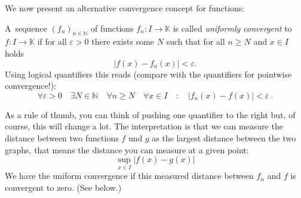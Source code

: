 

We now present an alternative convergence concept for functions:

\begin{Definition}
A~sequence $(f_n)_{n\in\mathbb{N}}$ of functions $f_n:I\to\mathbb{K}$ is called \emph{uniformly convergent} to $f:I\to\mathbb{K}$ if for all $\varepsilon>0$ there exists some $N$ such that for all $n\geq N$ and $x\in I$ holds
\[|f(x)-f_n(x)|<\varepsilon.\]
Using logical quantifiers this reads (compare with the quantifiers for pointwise convergence!):
\begin{equation}\label{def:lunifconv}
		 \forall \varepsilon > 0 
	\quad \exists N \in \mathbb{N}
	\quad \forall n \geq N
	\quad \forall x \in I
	\quad : \quad
	|f_n(x)-f(x)|<\varepsilon \ .
\end{equation}
\end{Definition}

As a rule of thumb, you can think of pushing one quantifier to the right but, of course, this will change a lot.
The interpretation is that we can measure the distance between two functions 
$f$ und $g$ as the largest distance between the two graphs, that means the distance you can measure at a given point:
	$$
		\sup_{x \in I} | f(x) - g(x) |
	$$
We have the uniform convergence 
if this measured distance between  $f_n$ and
$f$ is convergent to zero. (See below.)

